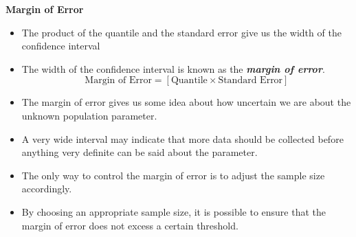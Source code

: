 			
			\textbf{Margin of Error}
			
			\begin{itemize}
				\item The product of the quantile and the standard error give us the width of the confidence interval
				\item The width of the confidence interval is known as the \textbf{\emph{margin of error}}.  \[ \mbox{Margin of Error}  = \left[ \mbox{Quantile} \times \mbox{Standard Error} \right] \]
				\item The margin of error gives us some idea about how uncertain we are about the unknown population parameter. \item A very wide interval may indicate that more data should be collected before anything very definite can be said about the parameter.
				\item The only way to control the margin of error is to adjust the sample size accordingly.
				\item By choosing an appropriate sample size, it is possible to ensure that the margin of error does not excess a certain threshold.
			\end{itemize}